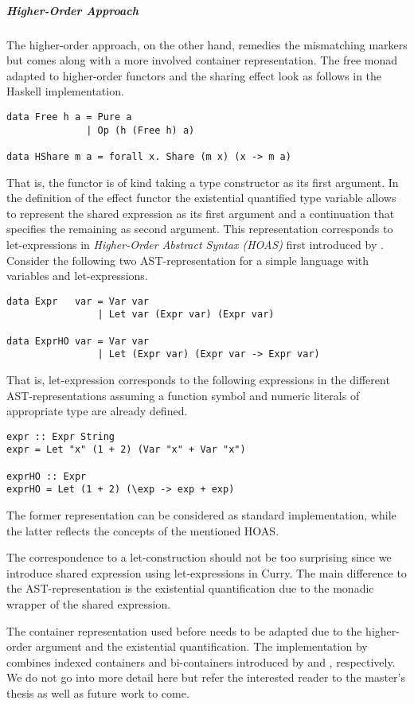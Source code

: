 \subparagraph{Higher-Order Approach}
The higher-order approach, on the other hand, remedies the mismatching markers but comes along with a more involved container representation.
The free monad adapted to higher-order functors and the sharing effect look as follows in the Haskell implementation.

\begin{verbatim}
data Free h a = Pure a
              | Op (h (Free h) a)  

data HShare m a = forall x. Share (m x) (x -> m a)
\end{verbatim}

That is, the functor  is of kind \hinl{(* -> *) -> * -> *} taking a type constructor as its first argument.
In the definition of the effect functor  the existential quantified type variable   allows to represent the shared expression as its first argument  and a continuation  that specifies the remaining as second argument.
This representation corresponds to let-expressions in \emph{Higher-Order Abstract Syntax (HOAS)} first introduced by \citet{pfenning1988higher}.
Consider the following two AST-representation for a simple language with variables and let-expressions.

\begin{verbatim}
data Expr   var = Var var
                | Let var (Expr var) (Expr var)

data ExprHO var = Var var
                | Let (Expr var) (Expr var -> Expr var)
\end{verbatim}

That is, let-expression  corresponds to the following expressions in the different AST-representations assuming a function symbol \hinl{+} and numeric literals of appropriate type are already defined.

\begin{verbatim}
expr :: Expr String
expr = Let "x" (1 + 2) (Var "x" + Var "x")

exprHO :: Expr
exprHO = Let (1 + 2) (\exp -> exp + exp)
\end{verbatim}

The former representation can be considered as standard implementation, while the latter reflects the concepts of the mentioned HOAS.

The correspondence to a let-construction should not be too surprising since we introduce shared expression using let-expressions in Curry.
The main difference to the AST-representation is the existential quantification due to the monadic wrapper of the shared expression.

The container representation used before needs to be adapted due to the higher-order argument and the existential quantification.
The implementation by \citeauthor{bunkenburg2019modeling} combines indexed containers and bi-containers introduced by \citet{altenkirch2015indexed} and \citet{ghani2007higher}, respectively.
We do not go into more detail here but refer the interested reader to the master's thesis as well as future work to come.
